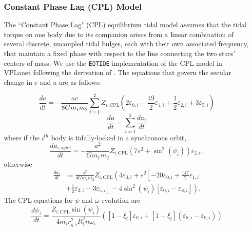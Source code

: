 \documentclass[twocolumn]{aastex61}
\newcommand{\eqtide}[0]{\texttt{EQTIDE}\xspace}
\begin{document}
\subsubsection{Constant Phase Lag (CPL) Model}

The ``Constant Phase Lag" (CPL) \citep[][]{FerrazMello2008,Heller2011} equilibrium tidal model assumes that the tidal torque on one body due to its companion arises from a linear combination of several discrete, uncoupled tidal bulges, each with their own associated frequency, that maintain a fixed phase with respect to the line connecting the two stars' centers of mass. We use the \eqtide implementation of the CPL model in VPLanet following the derivation of \citet{FerrazMello2008}.  The equations that govern the secular change in $e$ and $a$ are as follows:

\begin{equation} \label{eqn:cpl:e}
\frac{de}{dt} = -\frac{ae}{8 G m_1 m_2} \sum_{i=1}^2 Z_{i,\mathrm{CPL}} \left( 2 \varepsilon_{0,i} - \frac{49}{2} \varepsilon_{1,i} + \frac{1}{2} \varepsilon_{2,i} + 3 \varepsilon_{5,i} \right)
\end{equation}
\begin{equation} \label{eqn:cpl:a}
\frac{da}{dt} = \sum_{i=1}^2 \frac{da_i}{dt}
\end{equation}
where if the $i^{th}$ body is tidally-locked in a synchronous orbit,
\begin{equation} \label{eqn:cpl:dadt_locked}
\frac{da_{i,sync}}{dt} = -\frac{a^2}{G m_1 m_2} Z_{i,\mathrm{CPL}} \left( 7 e^2 + \sin^2 (\psi_i) \right) \varepsilon_{2,i},
\end{equation}
otherwise
\begin{equation}
\begin{split}
\frac{da_i}{dt} & = \frac{a^2}{4 G m_1 m_2} Z_{i,\mathrm{CPL}} \left( 4 \varepsilon_{0,i} + e^2 \left[ -20 \varepsilon_{0,i} + \frac{147}{2} \varepsilon_{1,i} \right. \right. \\
&  + \left. \left. \frac{1}{2} \varepsilon_{2,i} - 3 \varepsilon_{5,i} \right] - 4 \sin^2 (\psi_i) \left[ \varepsilon_{0,i} - \varepsilon_{8,i} \right] \right).
\end{split}
\end{equation}
The CPL equations for $\psi$ and $\omega$ evolution are
\begin{equation} \label{eqn:cpl:psi}
\frac{d\psi_i}{dt} = \frac{Z_{i,\mathrm{CPL}} \sin(\psi_i)}{4 m_i r_{g,i}^2 R_i^2 n \omega_i} \left( [1-\xi_i] \varepsilon_{0,i} + [1+\xi_i](\varepsilon_{8,i} - \varepsilon_{9,i}) \right)
\end{equation}
\end{document}
